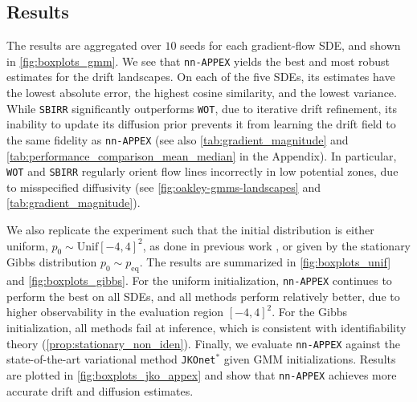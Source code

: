 \documentclass[twoside]{article}
\newcommand{\jkonetstar}{\texttt{JKOnet}$^\ast$}
\newcommand{\nappex}{\texttt{nn-APPEX}}
\newcommand{\wot}{\texttt{WOT}}
\newcommand{\sbirr}{\texttt{SBIRR}}
\begin{document}

\subsection{Results}
The results are aggregated over $10$ seeds for each gradient-flow SDE, and shown in \cref{fig:boxplots_gmm}. We see that \nappex{} yields the best and most robust estimates for the drift landscapes. On each of the five SDEs, its estimates have the lowest absolute error, the highest cosine similarity, and the lowest variance. While \sbirr{} significantly outperforms \wot, due to iterative drift refinement, its inability to update its diffusion prior prevents it from learning the drift field to the same fidelity as \nappex{} (see also \cref{tab:gradient_magnitude} and \cref{tab:performance_comparison_mean_median} in the Appendix). In particular, \wot{} and \sbirr{} regularly orient flow lines incorrectly in low potential zones, due to misspecified diffusivity (see \cref{fig:oakley-gmms-landscapes} and \cref{tab:gradient_magnitude}).

We also replicate the experiment such that the initial distribution is either uniform, $p_0 \sim \textrm{Unif}[-4,4]^2$, as done in previous work \citep{terpin2024learning}, or given by the stationary Gibbs distribution $p_0 \sim p_{\mathrm{eq}}$. The results are summarized in \cref{fig:boxplots_unif} and \cref{fig:boxplots_gibbs}. For the uniform initialization, \nappex{} continues to perform the best on all SDEs, and all methods perform relatively better, due to higher observability in the evaluation region $[-4,4]^2$. For the Gibbs initialization, all methods fail at inference, which is consistent with identifiability theory (\cref{prop:stationary_non_iden}). Finally, we evaluate \nappex{} against the state-of-the-art variational method \jkonetstar{} \citep{terpin2024learning} given GMM initializations. Results are plotted in \cref{fig:boxplots_jko_appex} and show that \nappex{} achieves more accurate drift and diffusion estimates.
\end{document}
